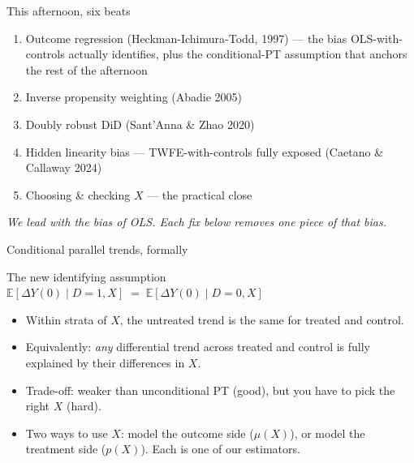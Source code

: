 \documentclass[aspectratio=169,11pt]{beamer}
\begin{document}
\begin{frame}{This afternoon, six beats}
\vspace{0.3em}
\begin{enumerate}\small
  \item Outcome regression (Heckman-Ichimura-Todd, 1997) --- the bias OLS-with-controls actually identifies, plus the conditional-PT assumption that anchors the rest of the afternoon
  \item Inverse propensity weighting (Abadie 2005)
  \item Doubly robust DiD (Sant'Anna \& Zhao 2020)
  \item Hidden linearity bias --- TWFE-with-controls fully exposed (Caetano \& Callaway 2024)
  \item Choosing \& checking $X$ --- the practical close
\end{enumerate}
\vspace{0.4em}
\begin{center}
\small\color{warmgray}\itshape
We lead with the bias of OLS. \;\;Each fix below removes one piece of that bias.
\end{center}
\end{frame}


\begin{frame}{Conditional parallel trends, formally}
\vspace{0.4em}
\begin{block}{The new identifying assumption}
\small
\centering
$\mathbb{E}[\Delta Y(0) \mid D{=}1, X] \;=\; \mathbb{E}[\Delta Y(0) \mid D{=}0, X]$
\end{block}
\vspace{0.5em}
\begin{itemize}\small
  \item Within strata of $X$, the untreated trend is the same for treated and control.
  \item Equivalently: \textit{any} differential trend across treated and control is fully explained by their differences in $X$.
  \item Trade-off: weaker than unconditional PT (good), but you have to pick the right $X$ (hard).
  \item Two ways to use $X$: model the outcome side ($\mu(X)$), or model the treatment side ($p(X)$). Each is one of our estimators.
\end{itemize}
\end{frame}
\end{document}
